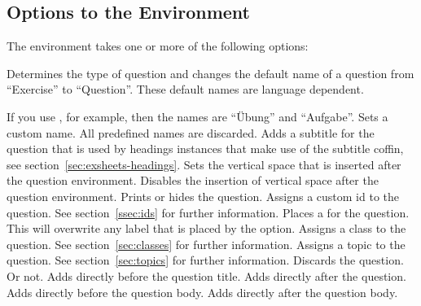 \documentclass[load-preamble+]{cnltx-doc}
\begin{document}
\subsection{Options to the  Environment}\label{sec:opti-ques-envir}
The  environment takes one or more of the following options:
\begin{options}
    Determines the type of question and changes the default name of a question
    from ``Exercise'' to ``Question''.  These default names are language
    dependent.\par
    If you use , for example, then
    the names are ``Übung'' and ``Aufgabe''.
  \Default
    Sets a custom name.  All predefined names are discarded.
  \Default
    Adds a subtitle  for the question that is used by headings
    instances that make use of the subtitle coffin, see
    section~\ref{sec:exsheets-headings}.
    Sets the vertical space that is inserted after the
    question environment.
    Disables the insertion of vertical space after the
    question environment.
    Prints or hides the question.
  \Default
    Assigns a custom \acs{id} to the question.  See section~\ref{ssec:ids} for
    further information.
  \Default
    Places a  for the question.  This will overwrite
    any label that is placed by the  option.
  \Default
    Assigns a class  to the question.  See
    section~\ref{sec:classes} for further information.
  \Default
    Assigns a topic  to the question.  See
    section~\ref{sec:topics} for further information.
    Discards the question.  Or not.
  \Default
    Adds  directly before the question title.
  \Default
    Adds  directly after the question.
  \Default
    Adds  directly before the question body.
  \Default
    Adds  directly after the question body.
\end{options}
\end{document}

